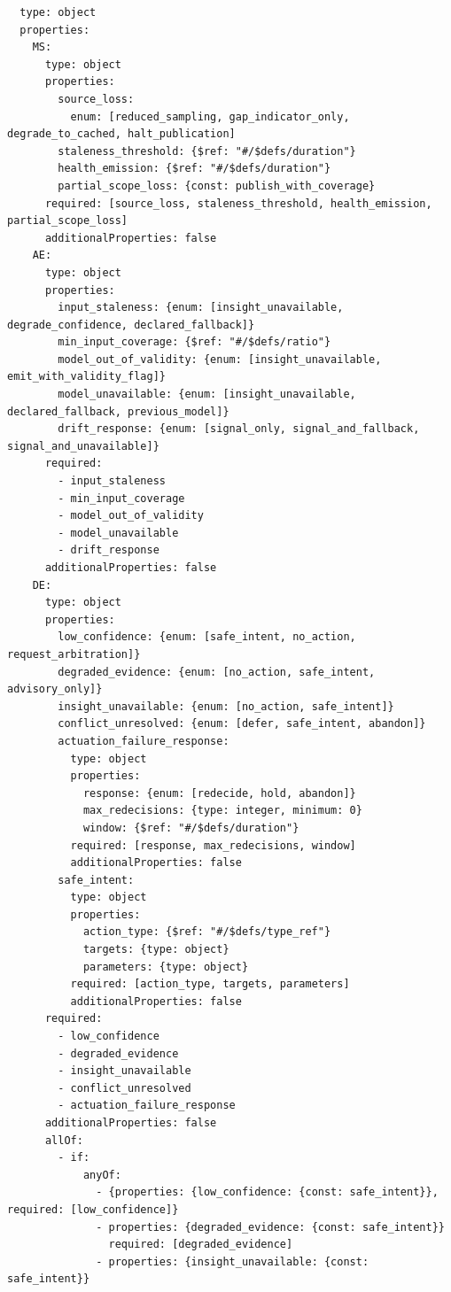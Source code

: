 \begin{verbatim}
  type: object
  properties:
    MS:
      type: object
      properties:
        source_loss:
          enum: [reduced_sampling, gap_indicator_only, degrade_to_cached, halt_publication]
        staleness_threshold: {$ref: "#/$defs/duration"}
        health_emission: {$ref: "#/$defs/duration"}
        partial_scope_loss: {const: publish_with_coverage}
      required: [source_loss, staleness_threshold, health_emission, partial_scope_loss]
      additionalProperties: false
    AE:
      type: object
      properties:
        input_staleness: {enum: [insight_unavailable, degrade_confidence, declared_fallback]}
        min_input_coverage: {$ref: "#/$defs/ratio"}
        model_out_of_validity: {enum: [insight_unavailable, emit_with_validity_flag]}
        model_unavailable: {enum: [insight_unavailable, declared_fallback, previous_model]}
        drift_response: {enum: [signal_only, signal_and_fallback, signal_and_unavailable]}
      required:
        - input_staleness
        - min_input_coverage
        - model_out_of_validity
        - model_unavailable
        - drift_response
      additionalProperties: false
    DE:
      type: object
      properties:
        low_confidence: {enum: [safe_intent, no_action, request_arbitration]}
        degraded_evidence: {enum: [no_action, safe_intent, advisory_only]}
        insight_unavailable: {enum: [no_action, safe_intent]}
        conflict_unresolved: {enum: [defer, safe_intent, abandon]}
        actuation_failure_response:
          type: object
          properties:
            response: {enum: [redecide, hold, abandon]}
            max_redecisions: {type: integer, minimum: 0}
            window: {$ref: "#/$defs/duration"}
          required: [response, max_redecisions, window]
          additionalProperties: false
        safe_intent:
          type: object
          properties:
            action_type: {$ref: "#/$defs/type_ref"}
            targets: {type: object}
            parameters: {type: object}
          required: [action_type, targets, parameters]
          additionalProperties: false
      required:
        - low_confidence
        - degraded_evidence
        - insight_unavailable
        - conflict_unresolved
        - actuation_failure_response
      additionalProperties: false
      allOf:
        - if:
            anyOf:
              - {properties: {low_confidence: {const: safe_intent}}, required: [low_confidence]}
              - properties: {degraded_evidence: {const: safe_intent}}
                required: [degraded_evidence]
              - properties: {insight_unavailable: {const: safe_intent}}

\end{verbatim}
